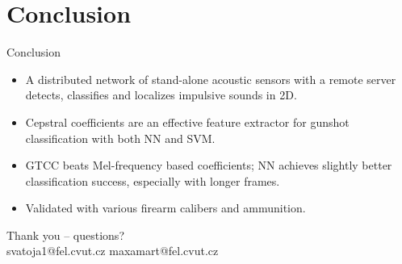 \documentclass[aspectratio=169,10pt]{beamer}
\begin{document}
\section{Conclusion}

\begin{frame}{Conclusion}
  \begin{itemize}
    \item A distributed network of stand-alone acoustic sensors with a remote server
          detects, classifies and localizes impulsive sounds in 2D.
    \item Cepstral coefficients are an effective feature extractor for gunshot
          classification with both NN and SVM.
    \item GTCC beats Mel-frequency based coefficients; NN achieves slightly better
          classification success, especially with longer frames.
    \item Validated with various firearm calibers and ammunition.
  \end{itemize}
  \vfill
  \centering
  \vspace{3mm}
  {\large Thank you -- questions?}\\[2mm]
  {\small\color{gray} svatoja1@fel.cvut.cz \quad maxamart@fel.cvut.cz}
\end{frame}

\appendix
\end{document}
